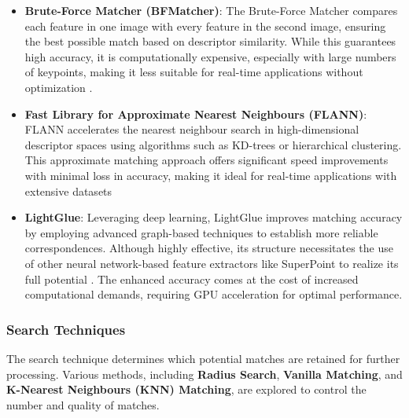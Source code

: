 \begin{itemize}
    \item \textbf{Brute-Force Matcher (BFMatcher)}: The Brute-Force Matcher compares each feature in one image with every feature in the second image, ensuring the best possible match based on descriptor similarity. While this guarantees high accuracy, it is computationally expensive, especially with large numbers of keypoints, making it less suitable for real-time applications without optimization \cite{opencv_bfmatcher}.
    
    \item \textbf{Fast Library for Approximate Nearest Neighbours (FLANN)}: FLANN accelerates the nearest neighbour search in high-dimensional descriptor spaces using algorithms such as KD-trees or hierarchical clustering. This approximate matching approach offers significant speed improvements with minimal loss in accuracy, making it ideal for real-time applications with extensive datasets \cite{opencv_flann_tutorial}
    
    \item \textbf{LightGlue}: Leveraging deep learning, LightGlue improves matching accuracy by employing advanced graph-based techniques to establish more reliable correspondences. Although highly effective, its structure necessitates the use of other neural network-based feature extractors like SuperPoint to realize its full potential \cite{cvg2023lightglue}. The enhanced accuracy comes at the cost of increased computational demands, requiring GPU acceleration for optimal performance.
\end{itemize}

\subsubsection{Search Techniques}

The search technique determines which potential matches are retained for further processing. Various methods, including \textbf{Radius Search}, \textbf{Vanilla Matching}, and \textbf{K-Nearest Neighbours (KNN) Matching}, are explored to control the number and quality of matches.

